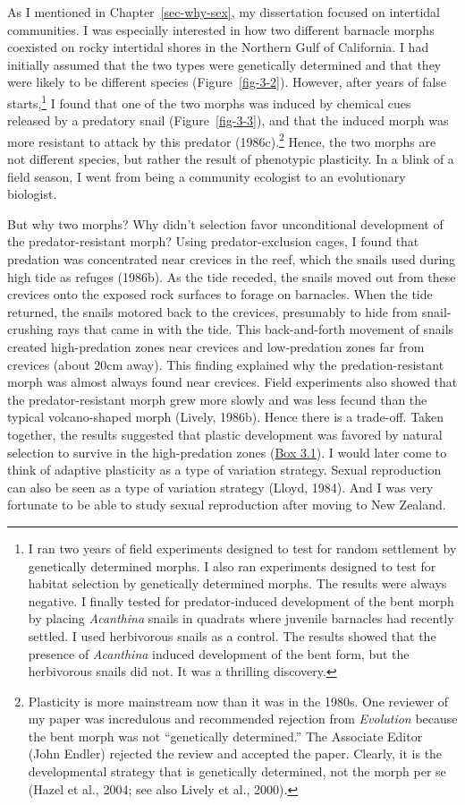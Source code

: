 \documentclass[
  letterpaper,
]{book}
\begin{document}
As I mentioned in Chapter~\ref{sec-why-sex}, my dissertation focused on
intertidal communities. I was especially interested in how two different
barnacle morphs coexisted on rocky intertidal shores in the Northern
Gulf of California. I had initially assumed that the two types were
genetically determined and that they were likely to be different species
(Figure~\ref{fig-3-2}). However, after years of false starts,\footnote{I
  ran two years of field experiments designed to test for random
  settlement by genetically determined morphs. I also ran experiments
  designed to test for habitat selection by genetically determined
  morphs. The results were always negative. I finally tested for
  predator-induced development of the bent morph by placing
  \emph{Acanthina} snails in quadrats where juvenile barnacles had
  recently settled. I used herbivorous snails as a control. The results
  showed that the presence of \emph{Acanthina} induced development of
  the bent form, but the herbivorous snails did not. It was a thrilling
  discovery.} I found that one of the two morphs was induced by chemical
cues released by a predatory snail (Figure~\ref{fig-3-3}), and that the
induced morph was more resistant to attack by this predator
(1986c).\footnote{Plasticity is more mainstream now than it was in the
  1980s. One reviewer of my paper was incredulous and recommended
  rejection from \emph{Evolution} because the bent morph was not
  ``genetically determined.'' The Associate Editor (John Endler)
  rejected the review and accepted the paper. Clearly, it is the
  developmental strategy that is genetically determined, not the morph
  per se (Hazel et al., 2004; see also Lively et al., 2000).} Hence, the
two morphs are not different species, but rather the result of
phenotypic plasticity. In a blink of a field season, I went from being a
community ecologist to an evolutionary biologist.

But why two morphs? Why didn't selection favor unconditional development
of the predator-resistant morph? Using predator-exclusion cages, I found
that predation was concentrated near crevices in the reef, which the
snails used during high tide as refuges (1986b). As the tide receded,
the snails moved out from these crevices onto the exposed rock surfaces
to forage on barnacles. When the tide returned, the snails motored back
to the crevices, presumably to hide from snail-crushing rays that came
in with the tide. This back-and-forth movement of snails created
high-predation zones near crevices and low-predation zones far from
crevices (about 20cm away). This finding explained why the
predation-resistant morph was almost always found near crevices. Field
experiments also showed that the predator-resistant morph grew more
slowly and was less fecund than the typical volcano-shaped morph
(Lively, 1986b). Hence there is a trade-off. Taken together, the results
suggested that plastic development was favored by natural selection to
survive in the high-predation zones (\protect\hyperlink{callout-4}{Box
3.1}). I would later come to think of adaptive plasticity as a type of
variation strategy. Sexual reproduction can also be seen as a type of
variation strategy (Lloyd, 1984). And I was very fortunate to be able to
study sexual reproduction after moving to New Zealand.
\end{document}
